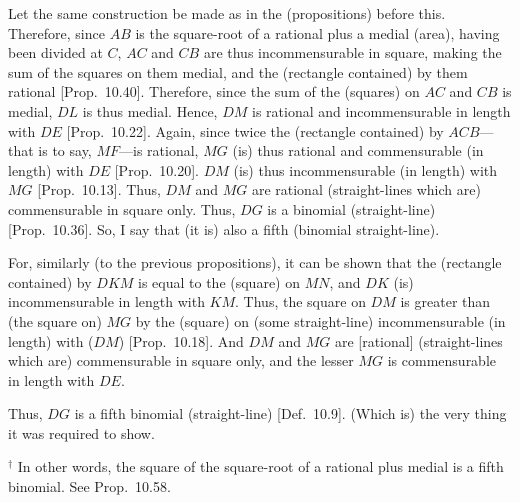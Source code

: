 \begin{Parallel}{}{}
{\epsfysize=1.5in 
\centerline{}

Let the same construction  be made as in the (propositions)
before this. Therefore, since $AB$ is the square-root of a
rational plus a medial (area), having been  divided at $C$, $AC$ and $CB$ are thus
incommensurable in square, making the sum of the squares on them
medial, and the (rectangle contained) by them rational [Prop.~10.40]. Therefore, since the
sum of the (squares) on $AC$ and $CB$ is medial, $DL$ is thus
medial. Hence, $DM$ is rational and incommensurable
in length with $DE$ [Prop.~10.22]. Again,
since twice the (rectangle contained) by $ACB$---that is to say,
$MF$---is rational, $MG$ (is) thus rational and commensurable
(in length) with $DE$ [Prop.~10.20]. 
$DM$ (is) thus incommensurable (in length) with $MG$ [Prop.~10.13]. Thus, $DM$ and $MG$
are rational (straight-lines which are) commensurable in square only. Thus,
$DG$ is a binomial (straight-line) [Prop.~10.36].
So, I say that (it is) also a fifth (binomial straight-line).

For, similarly (to the previous propositions), it can be shown that the
(rectangle contained) by $DKM$ is equal to the (square) on $MN$,
and $DK$ (is) incommensurable in length with $KM$. Thus, the
square on $DM$ is greater than (the square on) $MG$ by the (square)
on (some straight-line) incommensurable (in length) with ($DM$)
[Prop.~10.18]. And  $DM$ and $MG$
are [rational] (straight-lines which are) commensurable in square only,
and the lesser $MG$ is commensurable in length with $DE$.

Thus, $DG$ is a fifth binomial (straight-line) [Def.~10.9]. (Which is) the very thing it was required to show.}
\end{Parallel}
{\footnotesize\noindent$^\dag$ In other words, the square of the square-root of a rational plus medial  is a
fifth binomial. See Prop.~10.58.}

